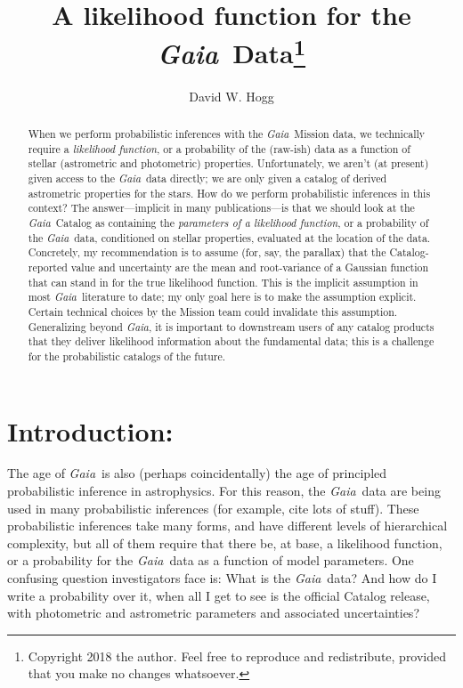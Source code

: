 \documentclass[12pt, modern]{aastex62}
\newcommand{\Gaia}{\textsl{Gaia}}
\begin{document}
\sloppy\sloppypar\raggedbottom\frenchspacing

\noindent
\title{A likelihood function for the \Gaia\ Data\footnote{%
  Copyright 2018 the author. Feel free to reproduce and redistribute, provided
  that you make no changes whatsoever.}}

\author[0000-0003-2866-9403]{David W. Hogg}

\begin{abstract}
When we perform probabilistic inferences with the \Gaia\ Mission data,
we technically require
a \emph{likelihood function}, or a probability of the (raw-ish) data as a function
of stellar (astrometric and photometric) properties.
Unfortunately, we aren't (at present) given access to the \Gaia\ data
directly;
we are only given a catalog of derived astrometric properties for the stars.
How do we perform probabilistic inferences in this context?
The answer---implicit in many publications---is that we should look at the
\Gaia\ Catalog as containing the \emph{parameters of a likelihood function}, or
a probability of the \Gaia\ data, conditioned on stellar properties,
evaluated at the location of the data.
Concretely, my recommendation is to assume
(for, say, the parallax) that the Catalog-reported
value and uncertainty are the mean and root-variance of a Gaussian
function that can stand in for the true likelihood function.
This is the implicit assumption in most \Gaia\ literature to date;
my only goal here is to make the assumption explicit.
Certain technical choices by the Mission team could invalidate
this assumption. Generalizing beyond \Gaia,
it is important to downstream users of any catalog products
that they deliver likelihood information about the fundamental data;
this is a challenge for the probabilistic catalogs of the future.
\end{abstract}

\section{Introduction:}
The age of \Gaia\ is also (perhaps coincidentally) the age of principled
probabilistic inference in astrophysics.
For this reason, the \Gaia\ data are being used in many probabilistic
inferences (for example, cite lots of stuff).
These probabilistic inferences take many forms, and have different levels
of hierarchical complexity, but all of them require that there be, at base,
a likelihood function, or a probability for the \Gaia\ data as a function
of model parameters.
One confusing question investigators face is: What is the \Gaia\ data?
And how do I write a probability over it, when all I get to see is the
official Catalog release, with photometric and astrometric parameters and associated
uncertainties?
\end{document}
